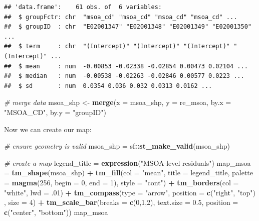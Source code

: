 \documentclass[
]{book}
\newenvironment{Shaded}{\begin{snugshade}}{\end{snugshade}}
\newcommand{\CommentTok}[1]{\textcolor[rgb]{0.56,0.35,0.01}{\textit{#1}}}
\newcommand{\DataTypeTok}[1]{\textcolor[rgb]{0.13,0.29,0.53}{#1}}
\newcommand{\DecValTok}[1]{\textcolor[rgb]{0.00,0.00,0.81}{#1}}
\newcommand{\FloatTok}[1]{\textcolor[rgb]{0.00,0.00,0.81}{#1}}
\newcommand{\KeywordTok}[1]{\textcolor[rgb]{0.13,0.29,0.53}{\textbf{#1}}}
\newcommand{\NormalTok}[1]{#1}
\newcommand{\OperatorTok}[1]{\textcolor[rgb]{0.81,0.36,0.00}{\textbf{#1}}}
\newcommand{\StringTok}[1]{\textcolor[rgb]{0.31,0.60,0.02}{#1}}
\begin{document}
\begin{verbatim}
## 'data.frame':    61 obs. of  6 variables:
##  $ groupFctr: chr  "msoa_cd" "msoa_cd" "msoa_cd" "msoa_cd" ...
##  $ groupID  : chr  "E02001347" "E02001348" "E02001349" "E02001350" ...
##  $ term     : chr  "(Intercept)" "(Intercept)" "(Intercept)" "(Intercept)" ...
##  $ mean     : num  -0.00853 -0.02338 -0.02854 0.00473 0.02104 ...
##  $ median   : num  -0.00538 -0.02263 -0.02846 0.00577 0.0223 ...
##  $ sd       : num  0.0354 0.036 0.032 0.0313 0.0162 ...
\end{verbatim}

\begin{Shaded}
\begin{Highlighting}[]
\CommentTok{# merge data}
\NormalTok{msoa_shp <-}\StringTok{ }\KeywordTok{merge}\NormalTok{(}\DataTypeTok{x =}\NormalTok{ msoa_shp, }\DataTypeTok{y =}\NormalTok{ re_msoa, }\DataTypeTok{by.x =} \StringTok{"MSOA_CD"}\NormalTok{, }\DataTypeTok{by.y =} \StringTok{"groupID"}\NormalTok{)}
\end{Highlighting}
\end{Shaded}

Now we can create our map:

\begin{Shaded}
\begin{Highlighting}[]
\CommentTok{# ensure geometry is valid}
\NormalTok{msoa_shp =}\StringTok{ }\NormalTok{sf}\OperatorTok{::}\KeywordTok{st_make_valid}\NormalTok{(msoa_shp)}

\CommentTok{# create a map}
\NormalTok{legend_title =}\StringTok{ }\KeywordTok{expression}\NormalTok{(}\StringTok{"MSOA-level residuals"}\NormalTok{)}
\NormalTok{map_msoa =}\StringTok{ }\KeywordTok{tm_shape}\NormalTok{(msoa_shp) }\OperatorTok{+}
\StringTok{  }\KeywordTok{tm_fill}\NormalTok{(}\DataTypeTok{col =} \StringTok{"mean"}\NormalTok{, }\DataTypeTok{title =}\NormalTok{ legend_title, }\DataTypeTok{palette =} \KeywordTok{magma}\NormalTok{(}\DecValTok{256}\NormalTok{, }\DataTypeTok{begin =} \DecValTok{0}\NormalTok{, }\DataTypeTok{end =} \DecValTok{1}\NormalTok{), }\DataTypeTok{style =} \StringTok{"cont"}\NormalTok{) }\OperatorTok{+}\StringTok{ }
\StringTok{  }\KeywordTok{tm_borders}\NormalTok{(}\DataTypeTok{col =} \StringTok{"white"}\NormalTok{, }\DataTypeTok{lwd =} \FloatTok{.01}\NormalTok{)  }\OperatorTok{+}\StringTok{ }
\StringTok{  }\KeywordTok{tm_compass}\NormalTok{(}\DataTypeTok{type =} \StringTok{"arrow"}\NormalTok{, }\DataTypeTok{position =} \KeywordTok{c}\NormalTok{(}\StringTok{"right"}\NormalTok{, }\StringTok{"top"}\NormalTok{) , }\DataTypeTok{size =} \DecValTok{4}\NormalTok{) }\OperatorTok{+}\StringTok{ }
\StringTok{  }\KeywordTok{tm_scale_bar}\NormalTok{(}\DataTypeTok{breaks =} \KeywordTok{c}\NormalTok{(}\DecValTok{0}\NormalTok{,}\DecValTok{1}\NormalTok{,}\DecValTok{2}\NormalTok{), }\DataTypeTok{text.size =} \FloatTok{0.5}\NormalTok{, }\DataTypeTok{position =}  \KeywordTok{c}\NormalTok{(}\StringTok{"center"}\NormalTok{, }\StringTok{"bottom"}\NormalTok{)) }
\NormalTok{map_msoa}
\end{Highlighting}
\end{Shaded}
\end{document}
